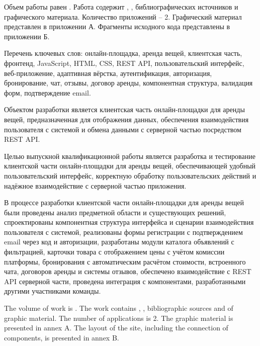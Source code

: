 
Объем работы равен . Работа содержит , ,  библиографических источников и  графического материала. Количество приложений – 2. Графический материал представлен в приложении А. Фрагменты исходного кода представлены в приложении Б.

Перечень ключевых слов: онлайн-площадка, аренда вещей, клиентская часть, фронтенд, JavaScript, HTML, CSS, REST API, пользовательский интерфейс, веб-приложение, адаптивная вёрстка, аутентификация, авторизация, бронирование, чат, отзывы, договор аренды, компонентная структура, валидация форм, подтверждение email.

Объектом разработки является клиентская часть онлайн-площадки для аренды вещей, предназначенная для отображения данных, обеспечения взаимодействия пользователя с системой и обмена данными с серверной частью посредством REST API.

Целью выпускной квалификационной работы является разработка и тестирование клиентской части онлайн-площадки для аренды вещей, обеспечивающей удобный пользовательский интерфейс, корректную обработку пользовательских действий и надёжное взаимодействие с серверной частью приложения.

В процессе разработки клиентской части онлайн-площадки для аренды вещей были проведены анализ предметной области и существующих решений, спроектированы компонентная структура интерфейса и сценарии взаимодействия пользователя с системой, реализованы формы регистрации с подтверждением email через код и авторизации, разработаны модули каталога объявлений с фильтрацией, карточки товара с отображением цены с учётом комиссии платформы, бронирования с автоматическим расчётом стоимости, встроенного чата, договоров аренды и системы отзывов, обеспечено взаимодействие с REST API серверной части, проведена интеграция с компонентами, разработанными другими участниками команды.


The volume of work is . The work contains , ,  bibliographic sources and  of graphic material. The number of applications is 2. The graphic material is presented in annex A. The layout of the site, including the connection of components, is presented in annex B.

